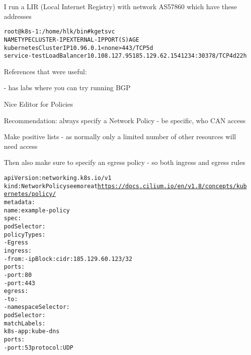 \documentclass[Screen16to9,17pt]{foils}
\begin{document}
\begin{list2}
\item {}
\item I run a LIR (Local Internet Registry) with network AS57860 which have these addresses
\end{list2}




\begin{alltt}\footnotesize
root@k8s-1:/home/hlk/bin# k get svc
NAME           TYPE           CLUSTER-IP      EXTERNAL-IP      PORT(S)          AGE
kubernetes     ClusterIP      10.96.0.1       <none>           443/TCP          5d
service-test   LoadBalancer   10.108.127.95   185.129.62.154   1234:30378/TCP   4d22h
\end{alltt}

References that were useful:
\begin{list2}
\item {}
\item {}
\item {} - has labs where you can try running BGP
\end{list2}




\begin{list2}
\item Nice Editor for Policies 
\item Recommendation: always specify a Network Policy - be specific, who CAN access
\item Make positive lists - as normally only a limited number of other resources will need access
\item Then also make sure to specify an egress policy - so both ingress and egress rules
\end{list2}


\begin{alltt}\scriptsize
apiVersion: networking.k8s.io/v1
kind: NetworkPolicy    see more at \url{https://docs.cilium.io/en/v1.8/concepts/kubernetes/policy/}
metadata:
  name: example-policy
spec:
  podSelector: {}
  policyTypes:
    - Egress
  ingress:
    - from: - ipBlock: cidr: 185.129.60.123/32
      ports:
        - port: 80
        - port: 443
  egress:
    - to:
        - namespaceSelector: {}
          podSelector:
            matchLabels:
              k8s-app: kube-dns
      ports:
        - port: 53          protocol: UDP
\end{alltt}
\end{document}
